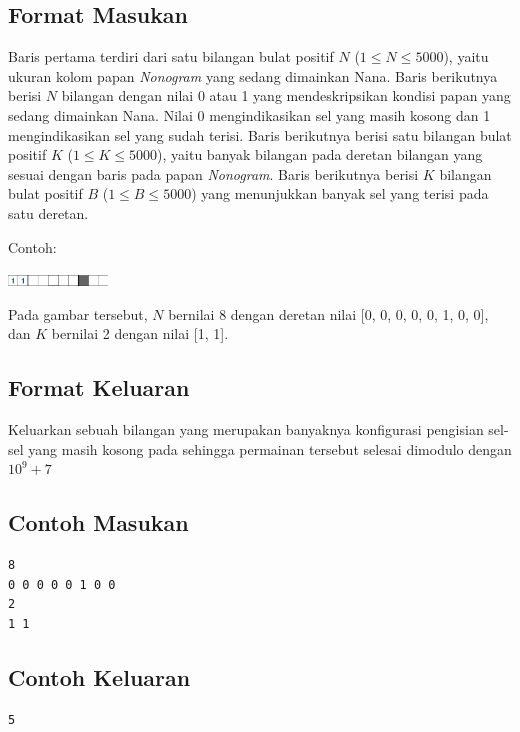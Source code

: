 \documentclass{article}
\begin{document}
\subsection*{Format Masukan}

Baris pertama terdiri dari satu bilangan bulat positif $N$ ($1 \leq N \leq 5000$), yaitu ukuran kolom papan \textit{Nonogram} yang sedang dimainkan Nana.
Baris berikutnya berisi $N$ bilangan dengan nilai 0 atau 1 yang mendeskripsikan kondisi papan  yang sedang dimainkan Nana. 
Nilai 0 mengindikasikan sel yang masih kosong dan 1 mengindikasikan sel yang sudah terisi.
Baris berikutnya berisi satu bilangan bulat positif $K$ ($1 \leq K \leq 5000$), yaitu banyak bilangan pada deretan bilangan yang sesuai dengan baris pada papan \textit{Nonogram}.
Baris berikutnya berisi $K$ bilangan bulat positif $B$ ($1 \leq B \leq 5000$) yang menunjukkan banyak sel yang terisi pada satu deretan.

Contoh:

\includegraphics[width=100px]{Nonogram-Row}

Pada gambar tersebut, $N$ bernilai 8 dengan deretan nilai [0, 0, 0, 0, 0, 1, 0, 0], dan $K$ bernilai 2 dengan nilai [1, 1].

\subsection*{Format Keluaran}

Keluarkan sebuah bilangan yang merupakan banyaknya konfigurasi pengisian sel-sel yang masih kosong pada  
sehingga permainan tersebut selesai dimodulo dengan $10^{9}+7$
\\

\begin{multicols}{2}
\subsection*{Contoh Masukan}
\begin{lstlisting}
8
0 0 0 0 0 1 0 0
2
1 1
\end{lstlisting}
\columnbreak
\subsection*{Contoh Keluaran}
\begin{lstlisting}
5
\end{lstlisting}
\vfill
\null
\end{multicols}

\pagebreak
\end{document}

